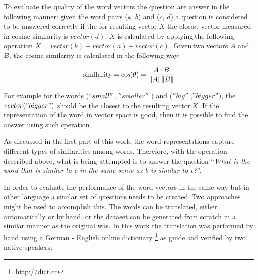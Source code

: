 To evaluate the quality of the word vectors the question  are answer in the
following manner: given the word pairs ($a$, $b$) and ($c$, $d$) a question
is considered to be answered correctly if the for resulting vector $X$ the closest vector measured in
cosine similarity is  $vector(d)$. $X$ is calculated by applying the following
operation $X = vector(b) - vector(a) + vector(c)$.  Given two vectors $A$ and $B$, the
cosine similarity is calculated in the following way: 

$$\text{similarity} = \cos(\theta) = {A \cdot B \over \|A\| \|B\|}$$


 For example  for the words
($``small''$, $''smaller''$ ) and ($''big''$ ,$"bigger"$),
the $vector("bigger")$ should be the closest to the resulting
vector $X$. If the representation of the word in
vector space is good, then it is possible to find the answer using such
operation \cite{DBLP:journals/corr/abs-1301-3781}.

As discussed in the first part of this work, the word representations
capture different types of  similarities among words. Therefore, with the
operation described above,  what is  being
attempted is to answer the question ``\emph{What is the word that is similar to
c in the same sense as b is similar to a?}''. 


In order to evaluate the performance of the word vectors in the same way but in other language a
similar set of questions  needs to be created. Two approaches might be used
to accomplish this. The words can be translated, either automatically or by hand, or the dataset can be
generated from scratch in a similar manner as the original was.  In this work
the translation was performed by hand using a German - English online dictionary \footnote{\url{http://dict.cc}} as guide and
verified by two native speakers.

